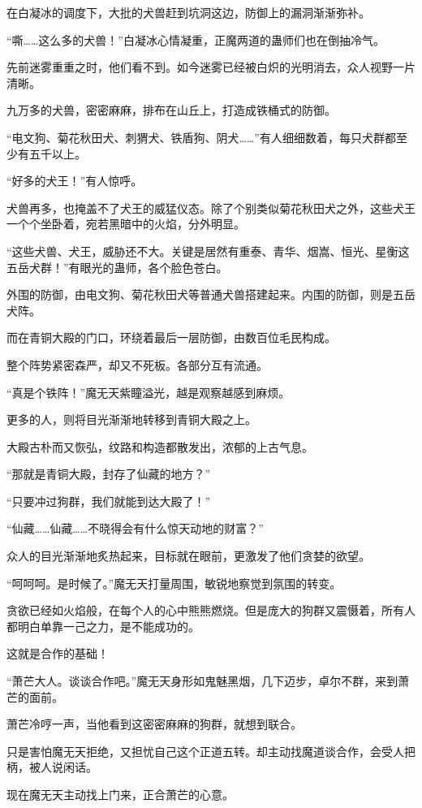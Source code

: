 \begin{this_body}
在白凝冰的调度下，大批的犬兽赶到坑洞这边，防御上的漏洞渐渐弥补。

“嘶……这么多的犬兽！”白凝冰心情凝重，正魔两道的蛊师们也在倒抽冷气。

先前迷雾重重之时，他们看不到。如今迷雾已经被白炽的光明消去，众人视野一片清晰。

九万多的犬兽，密密麻麻，排布在山丘上，打造成铁桶式的防御。

“电文狗、菊花秋田犬、刺猬犬、铁盾狗、阴犬……”有人细细数着，每只犬群都至少有五千以上。

“好多的犬王！”有人惊呼。

犬兽再多，也掩盖不了犬王的威猛仪态。除了个别类似菊花秋田犬之外，这些犬王一个个坐卧着，宛若黑暗中的火焰，分外明显。

“这些犬兽、犬王，威胁还不大。关键是居然有重泰、青华、烟嵩、恒光、星衡这五岳犬群！”有眼光的蛊师，各个脸色苍白。

外围的防御，由电文狗、菊花秋田犬等普通犬兽搭建起来。内围的防御，则是五岳犬阵。

而在青铜大殿的门口，环绕着最后一层防御，由数百位毛民构成。

整个阵势紧密森严，却又不死板。各部分互有流通。

“真是个铁阵！”魔无天紫瞳溢光，越是观察越感到麻烦。

更多的人，则将目光渐渐地转移到青铜大殿之上。

大殿古朴而又恢弘，纹路和构造都散发出，浓郁的上古气息。

“那就是青铜大殿，封存了仙藏的地方？”

“只要冲过狗群，我们就能到达大殿了！”

“仙藏……仙藏……不晓得会有什么惊天动地的财富？”

众人的目光渐渐地炙热起来，目标就在眼前，更激发了他们贪婪的欲望。

“呵呵呵。是时候了。”魔无天打量周围，敏锐地察觉到氛围的转变。

贪欲已经如火焰般，在每个人的心中熊熊燃烧。但是庞大的狗群又震慑着，所有人都明白单靠一己之力，是不能成功的。

这就是合作的基础！

“萧芒大人。谈谈合作吧。”魔无天身形如鬼魅黑烟，几下迈步，卓尔不群，来到萧芒的面前。

萧芒冷哼一声，当他看到这密密麻麻的狗群，就想到联合。

只是害怕魔无天拒绝，又担忧自己这个正道五转。却主动找魔道谈合作，会受人把柄，被人说闲话。

现在魔无天主动找上门来，正合萧芒的心意。


\end{this_body}

